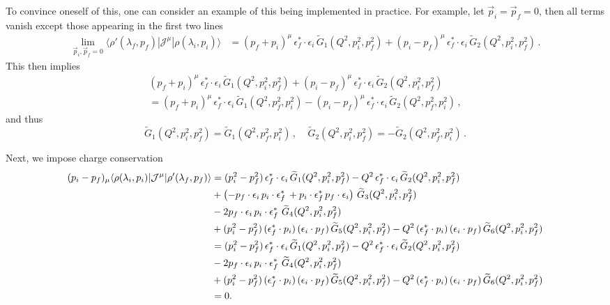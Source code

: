 To convince oneself of this, one can consider an example of this being implemented in practice. For example, let $\vec{p}_i=\vec{p}_f=0$, then all terms vanish except those appearing in the first two lines
\begin{align}
\lim_{\vec{p}_i,\vec{p}_f=0}\langle\rho'(\lambda_f,p_f)|{\mathcal{J}}^{\mu}|\rho(\lambda_i,p_i)\rangle
&=
(p_f+p_i)^\mu \,\epsilon_f^*\cdot \epsilon_i\, \widetilde{G}_1(Q^2,p_i^2,p_f^2)
+(p_i-p_f)^\mu \,\epsilon_f^*\cdot \epsilon_i\,\widetilde{G}_2(Q^2,p_i^2,p_f^2) \,.
\end{align} 
{\mh This then implies
\begin{multline}
(p_f+p_i)^\mu \,\epsilon_f^*\cdot \epsilon_i\, \widetilde{G}_1(Q^2,p_i^2,p_f^2)
+(p_i-p_f)^\mu \,\epsilon_f^*\cdot \epsilon_i\,\widetilde{G}_2(Q^2,p_i^2,p_f^2) \\[5pt]
= (p_f+p_i)^\mu \,\epsilon_f^*\cdot \epsilon_i\, \widetilde{G}_1(Q^2,p_f^2,p_i^2)
-(p_i-p_f)^\mu \,\epsilon_f^*\cdot \epsilon_i\,\widetilde{G}_2(Q^2,p_f^2,p_i^2) \,,
\end{multline} 
and thus
\begin{equation}
\widetilde{G}_1(Q^2,p_i^2,p_f^2) = \widetilde{G}_1(Q^2,p_f^2,p_i^2) \,, \ \ \ \ \ \widetilde{G}_2(Q^2,p_i^2,p_f^2) = - \widetilde{G}_2(Q^2,p_f^2,p_i^2) \,.
\end{equation}
}

 Next, we impose charge conservation
\begin{align}
(p_i-p_f)_\mu\langle\rho(\lambda_i,p_i)|{\mathcal{J}}^{\mu}|\rho'(\lambda_f,p_f)\rangle
&=
(p_i^2-p_f^2) \,\epsilon_f^*\cdot \epsilon_i\, \widetilde{G}_1(Q^2,p_i^2,p_f^2)
-Q^2 \,\epsilon_f^*\cdot \epsilon_i\,\widetilde{G}_2(Q^2,p_i^2,p_f^2)
\nonumber\\&
+
\left(-p_f\cdot\epsilon_i\, p_i\cdot \epsilon_f^*\,+p_i\cdot\epsilon_f^{*}\, p_f\cdot \epsilon_i\right)
\,\widetilde{G}_3(Q^2,p_i^2,p_f^2)
\nonumber\\&
-2p_f\cdot\epsilon_i\, p_i\cdot \epsilon_f^*\,
\,\widetilde{G}_4(Q^2,p_i^2,p_f^2)
\nonumber\\
&+(p_i^2-p_f^2) \,(\epsilon_f^*\cdot p_i)\,(\epsilon_i\cdot p_f)\,\widetilde{G}_5(Q^2,p_i^2,p_f^2)
-Q^2 \,(\epsilon_f^*\cdot p_i)\,(\epsilon_i\cdot p_f)\,\widetilde{G}_6(Q^2,p_i^2,p_f^2)
\nonumber\\
&=
(p_i^2-p_f^2) \,\epsilon_f^*\cdot \epsilon_i\, \widetilde{G}_1(Q^2,p_i^2,p_f^2)
-Q^2 \,\epsilon_f^*\cdot \epsilon_i\,\widetilde{G}_2(Q^2,p_i^2,p_f^2)
\nonumber\\
&-2p_f\cdot\epsilon_i\, p_i\cdot \epsilon_f^*\,
\,\widetilde{G}_4(Q^2,p_i^2,p_f^2)
\nonumber\\&
+(p_i^2-p_f^2) \,(\epsilon_f^*\cdot p_i)\,(\epsilon_i\cdot p_f)\,\widetilde{G}_5(Q^2,p_i^2,p_f^2)
-Q^2 \,(\epsilon_f^*\cdot p_i)\,(\epsilon_i\cdot p_f)\,\widetilde{G}_6(Q^2,p_i^2,p_f^2)
\nonumber\\
&=0.
\label{eq:charge_cons_rho}
\end{align}

